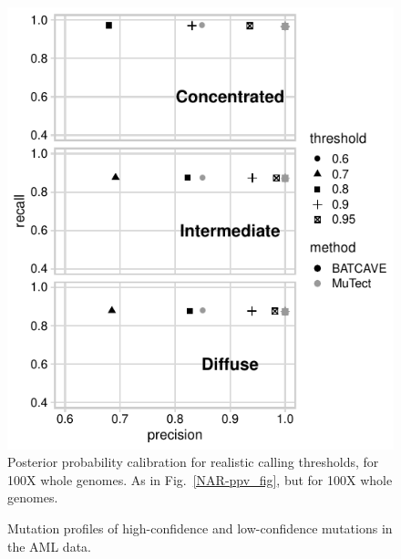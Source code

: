 \documentclass[a4,center,fleqn]{NAR}
\begin{document}
\begin{figure} [H]
\centering
  \includegraphics{figures/ppv_wgs.pdf}
  \caption{Posterior probability calibration for realistic calling thresholds, for 100X whole genomes. As in Fig.~\ref{NAR-ppv_fig}, but for 100X whole genomes.}
\label{NAR-ppv_wgs_fig}
\end{figure}

\begin{figure} [H]
\centering
  \caption{Mutation profiles of high-confidence and low-confidence mutations in the AML data.}
\label{fig:AML_profiles}
\end{figure}
\end{document}
